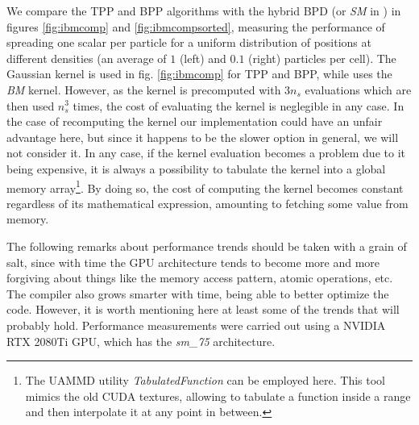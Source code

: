\documentclass[ twoside,openright,titlepage,numbers=noenddot,%
headinclude,footinclude,cleardoublepage=empty,abstract=on,
BCOR=5mm,paper=a4,fontsize=11pt, dvipsnames
]{scrreprt}
\newcommand{\uammd}{\gls{UAMMD}\xspace}
\newcommand{\gpu}{\gls{GPU}\xspace}
\begin{document}
We compare the TPP and BPP algorithms with the hybrid BPD (or \emph{SM} in \cite{Shih2021}) in figures \ref{fig:ibmcomp} and \ref{fig:ibmcompsorted}, measuring the performance of spreading one scalar per particle for a uniform distribution of positions at different densities (an average of $1$ (left) and $0.1$ (right) particles per cell). The Gaussian kernel is used in fig. \ref{fig:ibmcomp} for TPP and BPP, while \cite{Shih2021} uses the \emph{BM} kernel. However, as the kernel is precomputed with $3n_s$ evaluations which are then used $n_s^3$ times, the cost of evaluating the kernel is neglegible in any case. In the case of recomputing the kernel our implementation could have an unfair advantage here, but since it happens to be the slower option in general, we will not consider it.
In any case, if the kernel evaluation becomes a problem due to it being expensive, it is always a possibility to tabulate the kernel into a global memory array\footnote{The \uammd utility \emph{TabulatedFunction} can be employed here. This tool mimics the old CUDA textures, allowing to tabulate a function inside a range and then interpolate it at any point in between.}. By doing so, the cost of computing the kernel becomes constant regardless of its mathematical expression, amounting to fetching some value from memory.

The following remarks about performance trends should be taken with a grain of salt, since with time the \gpu architecture tends to become more and more forgiving about things like the memory access pattern, atomic operations, etc. The compiler also grows smarter with time, being able to better optimize the code. However, it is worth mentioning here at least some of the trends that will probably hold. Performance measurements were carried out using a NVIDIA RTX 2080Ti \gpu, which has the \emph{sm\_75} architecture.
\end{document}
